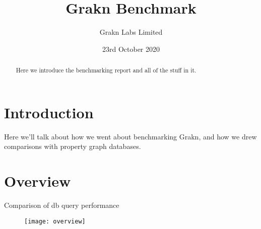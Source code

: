 \documentclass{article}
\begin{document}
\title{Grakn Benchmark}
\date{23rd October 2020}
\author{Grakn Labs Limited}

\maketitle

\begin{abstract}
Here we introduce the benchmarking report and all of the stuff in it.
\end{abstract}

\section{Introduction}
Here we'll talk about how we went about benchmarking Grakn, and how we drew comparisons with property graph databases.

\section{Overview}
Comparison of db query performance

\begin{figure}[H]
\centering
\texttt{[image: overview]}
\end{figure}
\end{document}
